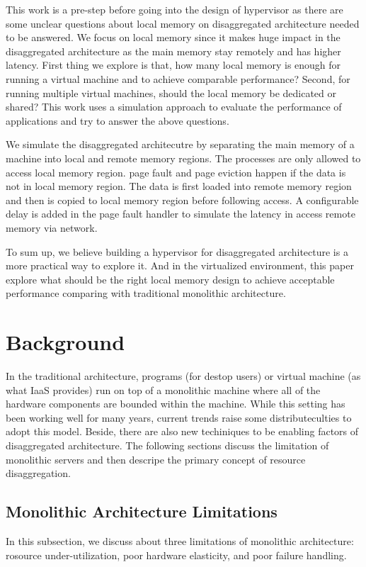 \documentclass[twocolumn]{article}
\begin{document}
This work is a pre-step before going into the design of hypervisor as there are some unclear questions about local memory on disaggregated architecture needed to be answered. We focus on local memory since it makes huge impact in the disaggregated architecture as the main memory stay remotely and has higher latency. First thing we explore is that, how many local memory is enough for running a virtual machine and to achieve comparable performance? Second, for running multiple virtual machines, should the local memory be dedicated or shared? This work uses a simulation approach to evaluate the performance of applications and try to answer the above questions.

We simulate the disaggregated architecutre by separating the main memory of a machine into local and remote memory regions. The processes are only allowed to access local memory region. page fault and page eviction happen if the data is not in local memory region. The data is first loaded into remote memory region and then is copied to local memory region before following access. A configurable delay is added in the page fault handler to simulate the latency in access remote memory via network.

To sum up, we believe building a hypervisor for disaggregated architecture is a more practical way to explore it. And in the virtualized environment, this paper explore what should be the right local memory design to achieve acceptable performance comparing with traditional monolithic architecture.

\section{Background}

In the traditional architecture, programs (for destop users) or virtual machine (as what IaaS provides) run on top of a monolithic machine where all of the hardware components are bounded within the machine.  While this setting has been working well for many years, current trends raise some distributeculties to adopt this model. Beside, there are also new techiniques to be enabling factors of disaggregated architecture.  The following sections discuss the limitation of monolithic servers and then descripe the primary concept of resource disaggregation.

\subsection{Monolithic Architecture Limitations}
In this subsection, we discuss about three limitations of monolithic architecture: rosource under-utilization, poor hardware elasticity, and poor failure handling.
\end{document}
